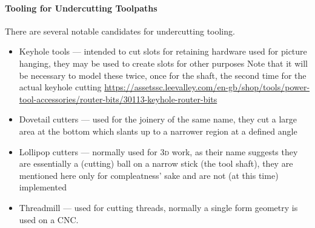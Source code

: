 \documentclass{ltxdoc}
\begin{document}
%
%
%

\paragraph{Tooling for Undercutting Toolpaths}

There are several notable candidates for undercutting tooling. \label{para:undercuttooling} 

\begin{itemize}
\item Keyhole tools --- intended to cut slots for retaining hardware used for picture
                        hanging, they may be used to create slots for other purposes
                        Note that it will be necessary to model these twice, once for
                        the shaft, the second time for the actual keyhole cutting
                        \url{https://assetssc.leevalley.com/en-gb/shop/tools/power-tool-accessories/router-bits/30113-keyhole-router-bits}
\item Dovetail cutters --- used for the joinery of the same name, they cut a large
                           area at the bottom which slants up to a narrower region
                           at a defined angle
\item Lollipop cutters --- normally used for \textsc{3d} work, as their name suggests they are
                           essentially a (cutting) ball on a narrow stick (the tool shaft), 
                           they are mentioned here only for compleatness' sake and are not
                           (at this time) implemented
\item Threadmill --- used for cutting threads, normally a single form geometry is used on a CNC.
\end{itemize}
\end{document}
